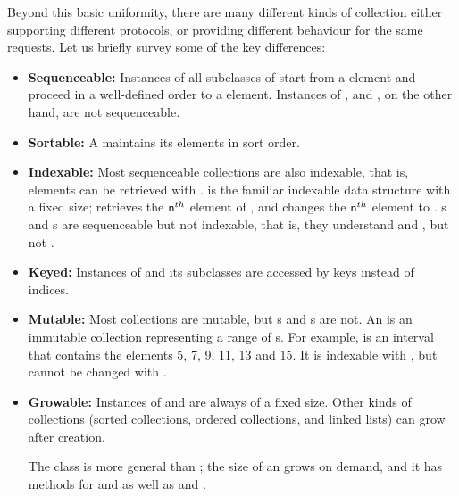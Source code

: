 \documentclass[a4paper,10pt,twoside]{book}
\begin{document}
Beyond this basic uniformity, there are many different kinds of collection either supporting different protocols, or providing different behaviour for the same requests.
Let us briefly survey some of the key differences:

\begin{itemize}
  \item {\bf Sequenceable:}
  Instances of all subclasses of  start from a  element and proceed in a well-defined order to a  element.
  Instances of ,  and , on the other hand, are not sequenceable.

  \item {\bf Sortable:}
  A  maintains its elements in sort order.

  \item {\bf Indexable:}
	Most sequenceable collections are also indexable, that is, elements can be retrieved with .
	 is the familiar indexable data structure with a fixed size;   retrieves the $\mbox{\ct{n}}^{th}$ element of , and  changes the $\mbox{\ct{n}}^{th}$ element to .
	s and s are sequenceable but not indexable, that is, they understand  and , but not .

  \item {\bf Keyed:}
	Instances of  and its subclasses are accessed by keys instead of indices.

  \item {\bf Mutable:}
  	Most collections are mutable, but s and s are not.
	An  is an immutable collection representing a range of s.  For example,  is an interval that contains the elements 5, 7, 9, 11, 13 and 15.  It is indexable with , but cannot be changed with .

  \item {\bf Growable:}
  	Instances of  and  are always of a fixed size. Other kinds of collections (sorted collections, ordered collections, and linked lists) can grow after creation.
	
	The class  is more general than ; the size of an  grows on demand, and it has methods for  and  as well as  and .
  

\end{itemize}
\end{document}
